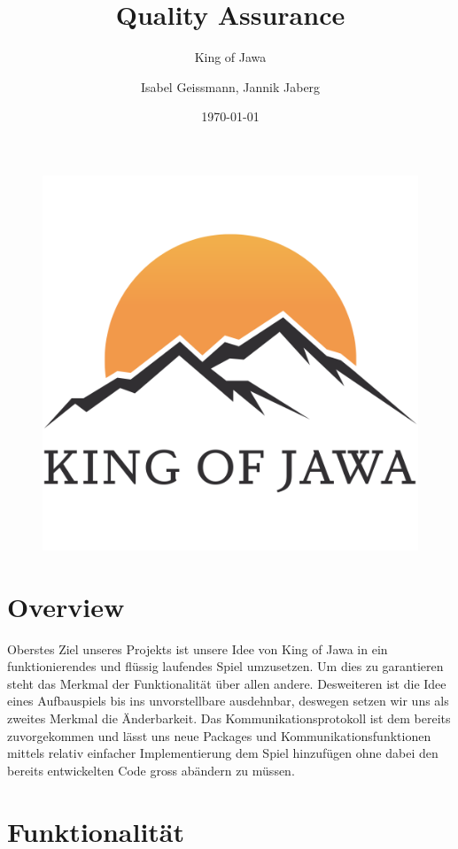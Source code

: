 \documentclass{scrartcl}
\title{Quality Assurance}
\subtitle{King of Jawa}
\author{Isabel Geissmann, Jannik Jaberg}
\date{\today}
\begin{document}
\maketitle
\begin{figure}[H]
	\includegraphics[width=\linewidth]{LOGO.png}
\end{figure}

\section{Overview}
Oberstes Ziel unseres Projekts ist unsere Idee von King of Jawa in ein funktionierendes und flüssig laufendes Spiel umzusetzen. Um dies zu garantieren steht das Merkmal der Funktionalität über allen andere.  Desweiteren ist die Idee eines Aufbauspiels bis ins unvorstellbare ausdehnbar, deswegen setzen wir uns als zweites Merkmal die Änderbarkeit. Das Kommunikationsprotokoll ist dem bereits zuvorgekommen und lässt uns neue Packages und Kommunikationsfunktionen mittels relativ einfacher Implementierung dem Spiel hinzufügen ohne dabei den bereits entwickelten Code gross abändern zu müssen. 

\section{Funktionalität}
\end{document}
